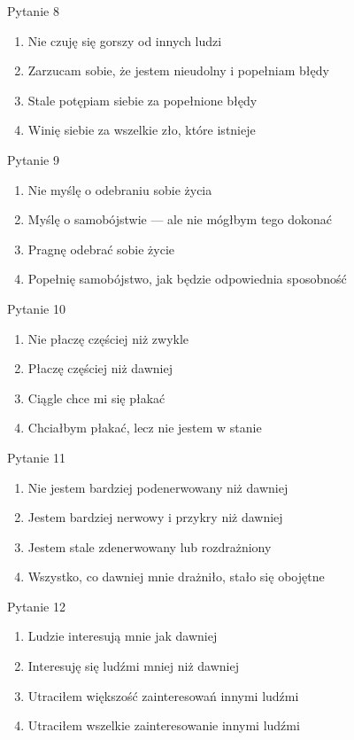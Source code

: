\documentclass[
  openany]{book}
\providecommand{\tightlist}{%
  \setlength{\itemsep}{0pt}\setlength{\parskip}{0pt}}
\begin{document}
Pytanie 8

\begin{enumerate}
\def\labelenumi{\arabic{enumi}.}
\setcounter{enumi}{-1}
\tightlist
\item
  Nie czuję się gorszy od innych ludzi
\item
  Zarzucam sobie, że jestem nieudolny i popełniam błędy
\item
  Stale potępiam siebie za popełnione błędy
\item
  Winię siebie za wszelkie zło, które istnieje
\end{enumerate}

Pytanie 9

\begin{enumerate}
\def\labelenumi{\arabic{enumi}.}
\setcounter{enumi}{-1}
\tightlist
\item
  Nie myślę o odebraniu sobie życia
\item
  Myślę o samobójstwie --- ale nie mógłbym tego dokonać
\item
  Pragnę odebrać sobie życie
\item
  Popełnię samobójstwo, jak będzie odpowiednia sposobność
\end{enumerate}

Pytanie 10

\begin{enumerate}
\def\labelenumi{\arabic{enumi}.}
\setcounter{enumi}{-1}
\tightlist
\item
  Nie płaczę częściej niż zwykle
\item
  Płaczę częściej niż dawniej
\item
  Ciągle chce mi się płakać
\item
  Chciałbym płakać, lecz nie jestem w stanie
\end{enumerate}

Pytanie 11

\begin{enumerate}
\def\labelenumi{\arabic{enumi}.}
\setcounter{enumi}{-1}
\tightlist
\item
  Nie jestem bardziej podenerwowany niż dawniej
\item
  Jestem bardziej nerwowy i przykry niż dawniej
\item
  Jestem stale zdenerwowany lub rozdrażniony
\item
  Wszystko, co dawniej mnie drażniło, stało się obojętne
\end{enumerate}

Pytanie 12

\begin{enumerate}
\def\labelenumi{\arabic{enumi}.}
\setcounter{enumi}{-1}
\tightlist
\item
  Ludzie interesują mnie jak dawniej
\item
  Interesuję się ludźmi mniej niż dawniej
\item
  Utraciłem większość zainteresowań innymi ludźmi
\item
  Utraciłem wszelkie zainteresowanie innymi ludźmi
\end{enumerate}
\end{document}
